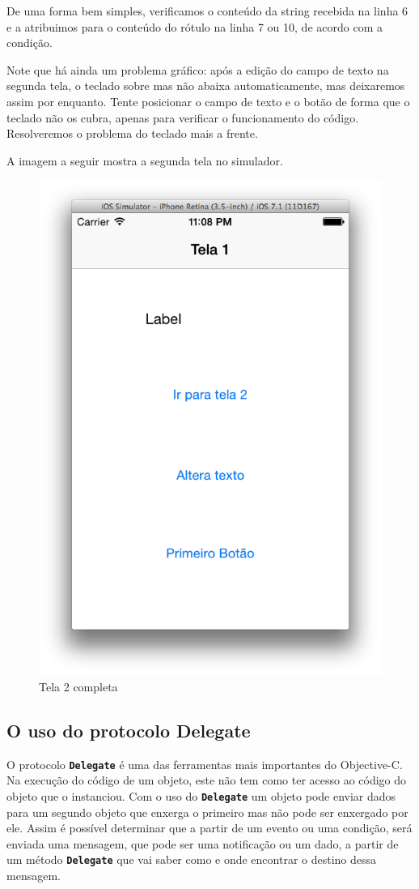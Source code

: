 \documentclass[a4paper,12pt,brazil,oneside]{book}
\begin{document}
De uma forma bem simples, verificamos o conteúdo da string recebida na linha 6 e a atribuimos para o conteúdo do rótulo na linha 7 ou 10, de acordo com a condição.

Note que há ainda um problema gráfico: após a edição do campo de texto na segunda tela, o teclado sobre mas não abaixa automaticamente, mas deixaremos assim por enquanto. Tente posicionar o campo de texto e o botão de forma que o teclado não os cubra, apenas para verificar o funcionamento do código. Resolveremos o problema do teclado mais a frente.

A imagem a seguir mostra a segunda tela no simulador.

\begin{figure}[H]
  \centering
  \includegraphics[width=.55\textwidth]{figuras/3/tela_novo_projeto_47.png}
  \caption{Tela 2 completa}
  \label{fig:a}
\end{figure}

\subsection{O uso do protocolo Delegate}

O protocolo \texttt{\textbf{Delegate}} é uma das ferramentas mais importantes do Objective-C. Na execução do código de um objeto, este não tem como ter acesso ao código do objeto que o instanciou. Com o uso do \texttt{\textbf{Delegate}} um objeto pode enviar dados para um segundo objeto que enxerga o primeiro mas não pode ser enxergado por ele. Assim é possível determinar que a partir de um evento ou uma condição, será enviada uma mensagem, que pode ser uma notificação ou um dado, a partir de um método \texttt{\textbf{Delegate}} que vai saber como e onde encontrar o destino dessa mensagem.
\end{document}
